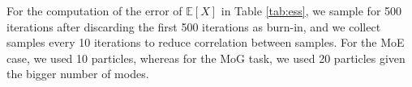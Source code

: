 \begin{table}[H]
\caption{Effective sample size results for the two synthetic distributions task}\label{tab:ess}
\end{table}

\begin{table}[H]
\caption{Error results for the two synthetic distributions task}\label{tab:ess2}
\end{table}

For the computation of the error of $\mathbb{E}\left[ X \right]$ in Table \ref{tab:ess}, we sample for 500 iterations after discarding the first 500 iterations as burn-in, and we collect samples every 10 iterations to reduce correlation between samples. For the MoE case, we used 10 particles, whereas for the MoG task, we used 20 particles given the bigger number of modes.


